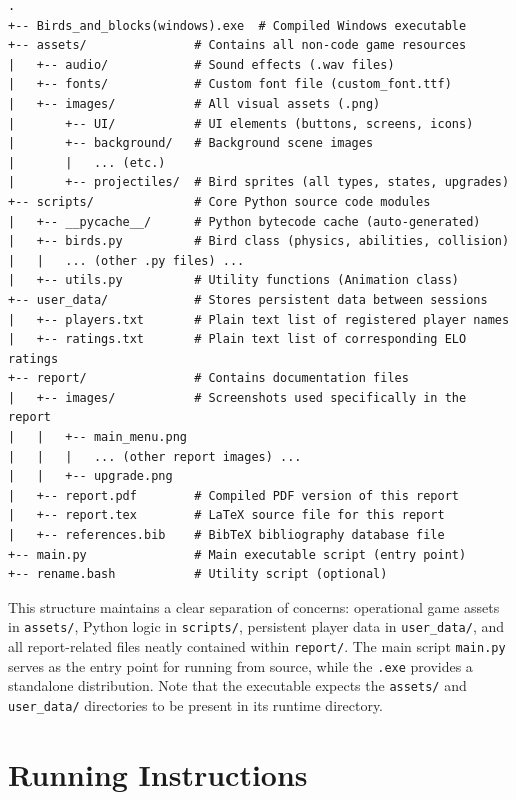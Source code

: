 \documentclass[11pt, a4paper]{article}
\begin{document}
\begin{lstlisting}[basicstyle=\scriptsize\ttfamily, frame=single, numbers=none, caption={Final Project Directory Structure}, label={lst:dir_structure_final}]
.
+-- Birds_and_blocks(windows).exe  # Compiled Windows executable
+-- assets/               # Contains all non-code game resources
|   +-- audio/            # Sound effects (.wav files)
|   +-- fonts/            # Custom font file (custom_font.ttf)
|   +-- images/           # All visual assets (.png)
|       +-- UI/           # UI elements (buttons, screens, icons)
|       +-- background/   # Background scene images
|       |   ... (etc.)
|       +-- projectiles/  # Bird sprites (all types, states, upgrades)
+-- scripts/              # Core Python source code modules
|   +-- __pycache__/      # Python bytecode cache (auto-generated)
|   +-- birds.py          # Bird class (physics, abilities, collision)
|   |   ... (other .py files) ...
|   +-- utils.py          # Utility functions (Animation class)
+-- user_data/            # Stores persistent data between sessions
|   +-- players.txt       # Plain text list of registered player names
|   +-- ratings.txt       # Plain text list of corresponding ELO ratings
+-- report/               # Contains documentation files
|   +-- images/           # Screenshots used specifically in the report
|   |   +-- main_menu.png
|   |   |   ... (other report images) ...
|   |   +-- upgrade.png
|   +-- report.pdf        # Compiled PDF version of this report
|   +-- report.tex        # LaTeX source file for this report
|   +-- references.bib    # BibTeX bibliography database file
+-- main.py               # Main executable script (entry point)
+-- rename.bash           # Utility script (optional)
\end{lstlisting}

This structure maintains a clear separation of concerns: operational game assets in \texttt{assets/}, Python logic in \texttt{scripts/}, persistent player data in \texttt{user\_data/}, and all report-related files neatly contained within \texttt{report/}. The main script \texttt{main.py} serves as the entry point for running from source, while the \texttt{.exe} provides a standalone distribution. Note that the executable expects the \texttt{assets/} and \texttt{user\_data/} directories to be present in its runtime directory.


\section{Running Instructions}
\end{document}
